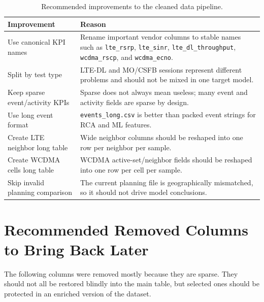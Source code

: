 \documentclass[12pt,a4paper]{article}
\begin{document}
\begin{table}[H]
\centering
\begin{tabularx}{\textwidth}{P{0.38\textwidth}Y}
\toprule
\textbf{Improvement} & \textbf{Reason} \\
\midrule
Use canonical KPI names & Rename important vendor columns to stable names such as \texttt{lte\_rsrp}, \texttt{lte\_sinr}, \texttt{lte\_dl\_throughput}, \texttt{wcdma\_rscp}, and \texttt{wcdma\_ecno}. \\
Split by test type & LTE-DL and MO/CSFB sessions represent different problems and should not be mixed in one target model. \\
Keep sparse event/activity KPIs & Sparse does not always mean useless; many event and activity fields are sparse by design. \\
Use long event format & \texttt{events\_long.csv} is better than packed event strings for RCA and ML features. \\
Create LTE neighbor long table & Wide neighbor columns should be reshaped into one row per neighbor per sample. \\
Create WCDMA cells long table & WCDMA active-set/neighbor fields should be reshaped into one row per cell per sample. \\
Skip invalid planning comparison & The current planning file is geographically mismatched, so it should not drive model conclusions. \\
\bottomrule
\end{tabularx}
\caption{Recommended improvements to the cleaned data pipeline.}
\end{table}


\section{Recommended Removed Columns to Bring Back Later}

The following columns were removed mostly because they are sparse. They should not all be restored blindly into the main table, but selected ones should be protected in an enriched version of the dataset.
\end{document}
